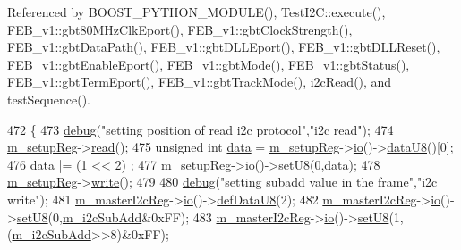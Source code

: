 Referenced by B\+O\+O\+S\+T\+\_\+\+P\+Y\+T\+H\+O\+N\+\_\+\+M\+O\+D\+U\+L\+E(), Test\+I2\+C\+::execute(), F\+E\+B\+\_\+v1\+::gbt80\+M\+Hz\+Clk\+Eport(), F\+E\+B\+\_\+v1\+::gbt\+Clock\+Strength(), F\+E\+B\+\_\+v1\+::gbt\+Data\+Path(), F\+E\+B\+\_\+v1\+::gbt\+D\+L\+L\+Eport(), F\+E\+B\+\_\+v1\+::gbt\+D\+L\+L\+Reset(), F\+E\+B\+\_\+v1\+::gbt\+Enable\+Eport(), F\+E\+B\+\_\+v1\+::gbt\+Mode(), F\+E\+B\+\_\+v1\+::gbt\+Status(), F\+E\+B\+\_\+v1\+::gbt\+Term\+Eport(), F\+E\+B\+\_\+v1\+::gbt\+Track\+Mode(), i2c\+Read(), and test\+Sequence().


\begin{DoxyCode}
472                            \{
473   \hyperlink{classObject_aac010553f022165573714b7014a15f0d}{debug}(\textcolor{stringliteral}{"setting position of read i2c protocol"},\textcolor{stringliteral}{"i2c read"});
474   \hyperlink{classSeqPGA_a03269241e7fc26493cd0595beda334c2}{m\_setupReg}->\hyperlink{classIOobject_aa07610c11963b1db6710e3c76ceea456}{read}();
475   \textcolor{keywordtype}{unsigned} \textcolor{keywordtype}{int} \hyperlink{namespaceshell_a5ea2525995cedc3efd69ea8a7f034d1e}{data} = \hyperlink{classSeqPGA_a03269241e7fc26493cd0595beda334c2}{m\_setupReg}->\hyperlink{classIOobject_af04fb94137c3d86849f478ac5afab5d1}{io}()->\hyperlink{classIOdata_a75e9c318dbac3a39402179070943d4bc}{dataU8}()[0];
476   data |= (1 << 2)  ;     
477   \hyperlink{classSeqPGA_a03269241e7fc26493cd0595beda334c2}{m\_setupReg}->\hyperlink{classIOobject_af04fb94137c3d86849f478ac5afab5d1}{io}()->\hyperlink{classIOdata_a6c4fb2f2af01889ada889c2b7aceb24d}{setU8}(0,data);
478   \hyperlink{classSeqPGA_a03269241e7fc26493cd0595beda334c2}{m\_setupReg}->\hyperlink{classIOobject_a9f6984bc9f0fadcf800f1be2523ac744}{write}();
479     
480   \hyperlink{classObject_aac010553f022165573714b7014a15f0d}{debug}(\textcolor{stringliteral}{"setting subadd value in the frame"},\textcolor{stringliteral}{"i2c write"});
481   \hyperlink{classSeqPGA_a942c71b33a4f43b7a994cb9216abb17e}{m\_masterI2cReg}->\hyperlink{classIOobject_af04fb94137c3d86849f478ac5afab5d1}{io}()->\hyperlink{classIOdata_a80bb230b61062b447db5832e43bf7b44}{defDataU8}(2);
482   \hyperlink{classSeqPGA_a942c71b33a4f43b7a994cb9216abb17e}{m\_masterI2cReg}->\hyperlink{classIOobject_af04fb94137c3d86849f478ac5afab5d1}{io}()->\hyperlink{classIOdata_a6c4fb2f2af01889ada889c2b7aceb24d}{setU8}(0,\hyperlink{classSeqPGA_a82bda98edb9681aff47733e83ac8bc4f}{m\_i2cSubAdd}&0xFF);
483   \hyperlink{classSeqPGA_a942c71b33a4f43b7a994cb9216abb17e}{m\_masterI2cReg}->\hyperlink{classIOobject_af04fb94137c3d86849f478ac5afab5d1}{io}()->\hyperlink{classIOdata_a6c4fb2f2af01889ada889c2b7aceb24d}{setU8}(1,(\hyperlink{classSeqPGA_a82bda98edb9681aff47733e83ac8bc4f}{m\_i2cSubAdd}>>8)&0xFF);

\end{DoxyCode}
